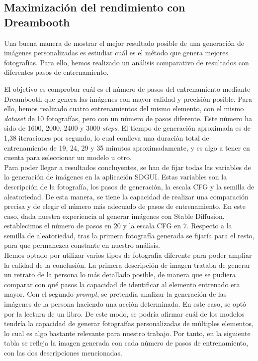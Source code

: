 \subsection{Maximización del rendimiento con Dreambooth}

Una buena manera de mostrar el mejor resultado posible de una generación de imágenes personalizadas es estudiar cuál es el método que genera mejores fotografías. Para ello, hemos realizado un análisis comparativo de resultados con diferentes pasos de entrenamiento.

El objetivo es comprobar cuál es el número de pasos del entrenamiento mediante Dreambooth que genera las imágenes con mayor calidad y precisión posible. Para ello, hemos realizado cuatro entrenamientos del mismo elemento, con el mismo \textit{dataset} de 10 fotografías, pero con un número de pasos diferente. Este número ha sido de 1600, 2000, 2400 y 3000 \textit{steps}. El tiempo de generación aproximada es de 1,38 iteraciones por segundo, lo cual conlleva una duración total de entrenamiento de 19, 24, 29 y 35 minutos aproximadamente, y es algo a tener en cuenta para seleccionar un modelo u otro.\\

Para poder llegar a resultados concluyentes, se han de fijar todas las variables de la generación de imágenes en la aplicación SDGUI. Estas variables son la descripción de la fotografía, los pasos de generación, la escala CFG y la semilla de aleatoriedad. De esta manera, se tiene la capacidad de realizar una comparación precisa y de elegir el número más adecuado de pasos de entrenamiento. En este caso, dada nuestra experiencia al generar imágenes con Stable Diffusion, establecimos el número de pasos en 20 y la escala CFG en 7. Respecto a la semilla de aleatoriedad, tras la primera fotografía generada se fijaría para el resto, para que permanezca constante en nuestro análisis.\\

Hemos optado por utilizar varios tipos de fotografía diferente para poder ampliar la calidad de la conclusión. La primera descripción de imagen trataba de generar un retrato de la persona lo más detallado posible, de manera que se pudiera comparar con qué pasos la capacidad de identificar al elemento entrenado era mayor. Con el segundo \textit{prompt}, se pretendía analizar la generación de las imágenes de la persona haciendo una acción determinada. En este caso, se optó por la lectura de un libro. De este modo, se podría afirmar cuál de los modelos tendría la capacidad de generar fotografías personalizadas de múltiples elementos, lo cual es algo bastante relevante para nuestro trabajo. Por tanto, en la siguiente tabla se refleja la imagen generada con cada número de pasos de entrenamiento, con las dos descripciones mencionadas.\\


